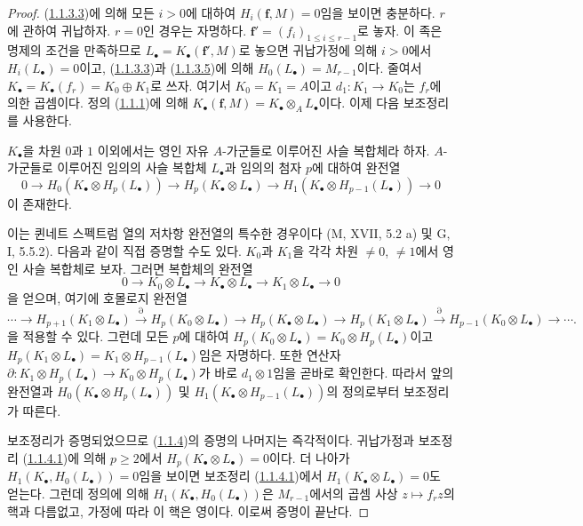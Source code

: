 \begin{proof}
(\hyperref[III.1.1.3.3-fr]{1.1.3.3})에 의해 모든 $i>0$에 대하여
$H_i(\mathbf f,M)=0$임을 보이면 충분하다. $r$에 관하여 귀납하자.
$r=0$인 경우는 자명하다. $\mathbf f'=(f_i)_{1\leq i\leq r-1}$로 놓자.
이 족은 명제의 조건을 만족하므로 $L_\bullet=K_\bullet(\mathbf f',M)$로
놓으면 귀납가정에 의해 $i>0$에서 $H_i(L_\bullet)=0$이고,
(\hyperref[III.1.1.3.3-fr]{1.1.3.3})과
(\hyperref[III.1.1.3.5-fr]{1.1.3.5})에 의해
$H_0(L_\bullet)=M_{r-1}$이다. 줄여서
$K_\bullet=K_\bullet(f_r)=K_0\oplus K_1$로 쓰자. 여기서
$K_0=K_1=A$이고 $d_1:K_1\to K_0$는 $f_r$에 의한 곱셈이다.
정의 (\hyperref[III.1.1.1-fr]{1.1.1})에 의해
$K_\bullet(\mathbf f,M)=K_\bullet\otimes_A L_\bullet$이다. 이제 다음 보조정리를
사용한다.

\begin{lemma}[1.1.4.1]
\label{III.1.1.4.1-fr}
$K_\bullet$을 차원 $0$과 $1$ 이외에서는 영인 자유 $A$-가군들로 이루어진
사슬 복합체라 하자. $A$-가군들로 이루어진 임의의 사슬 복합체
$L_\bullet$과 임의의 첨자 $p$에 대하여 완전열
\[
0\longrightarrow H_0(K_\bullet\otimes H_p(L_\bullet))
\longrightarrow H_p(K_\bullet\otimes L_\bullet)
\longrightarrow H_1(K_\bullet\otimes H_{p-1}(L_\bullet))
\longrightarrow0
\]
이 존재한다.
\end{lemma}

이는 퀸네트 스펙트럼 열의 저차항 완전열의 특수한 경우이다
(M, XVII, 5.2 a) 및 G, I, 5.5.2). 다음과 같이 직접 증명할 수도 있다.
$K_0$과 $K_1$을 각각 차원 $\neq0$, $\neq1$에서 영인 사슬 복합체로 보자.
그러면 복합체의 완전열
\[
0\longrightarrow K_0\otimes L_\bullet
\longrightarrow K_\bullet\otimes L_\bullet
\longrightarrow K_1\otimes L_\bullet\longrightarrow0
\]
을 얻으며, 여기에 호몰로지 완전열
\[
\cdots\longrightarrow H_{p+1}(K_1\otimes L_\bullet)
\xrightarrow{\partial}H_p(K_0\otimes L_\bullet)
\longrightarrow H_p(K_\bullet\otimes L_\bullet)
\longrightarrow H_p(K_1\otimes L_\bullet)
\xrightarrow{\partial}H_{p-1}(K_0\otimes L_\bullet)
\longrightarrow\cdots.
\]
을 적용할 수 있다. 그런데 모든 $p$에 대하여
$H_p(K_0\otimes L_\bullet)=K_0\otimes H_p(L_\bullet)$이고
$H_p(K_1\otimes L_\bullet)=K_1\otimes H_{p-1}(L_\bullet)$임은 자명하다.
또한 연산자
$\partial:K_1\otimes H_p(L_\bullet)\to K_0\otimes H_p(L_\bullet)$가 바로
$d_1\otimes1$임을 곧바로 확인한다. 따라서 앞의 완전열과
$H_0(K_\bullet\otimes H_p(L_\bullet))$ 및
$H_1(K_\bullet\otimes H_{p-1}(L_\bullet))$의 정의로부터 보조정리가 따른다.

보조정리가 증명되었으므로 (\hyperref[III.1.1.4-fr]{1.1.4})의 증명의
나머지는 즉각적이다. 귀납가정과 보조정리
(\hyperref[III.1.1.4.1-fr]{1.1.4.1})에 의해 $p\geq2$에서
$H_p(K_\bullet\otimes L_\bullet)=0$이다. 더 나아가
$H_1(K_\bullet,H_0(L_\bullet))=0$임을 보이면 보조정리
(\hyperref[III.1.1.4.1-fr]{1.1.4.1})에서
$H_1(K_\bullet\otimes L_\bullet)=0$도 얻는다. 그런데 정의에 의해
$H_1(K_\bullet,H_0(L_\bullet))$은 $M_{r-1}$에서의 곱셈 사상
$z\mapsto f_rz$의 핵과 다름없고, 가정에 따라 이 핵은 영이다. 이로써
증명이 끝난다.
\end{proof}

